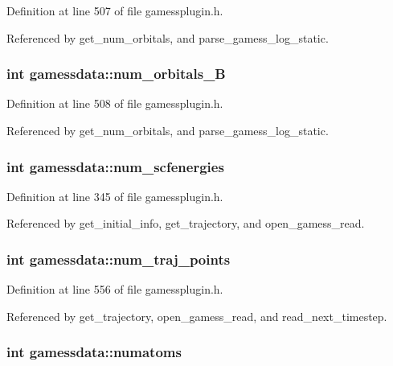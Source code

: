 Definition at line 507 of file gamessplugin.h.

Referenced by get\_\-num\_\-orbitals, and parse\_\-gamess\_\-log\_\-static.
\subsubsection{\setlength{\rightskip}{0pt plus 5cm}int gamessdata::num\_\-orbitals\_\-B}\label{structgamessdata_m70}




Definition at line 508 of file gamessplugin.h.

Referenced by get\_\-num\_\-orbitals, and parse\_\-gamess\_\-log\_\-static.
\subsubsection{\setlength{\rightskip}{0pt plus 5cm}int gamessdata::num\_\-scfenergies}\label{structgamessdata_m26}




Definition at line 345 of file gamessplugin.h.

Referenced by get\_\-initial\_\-info, get\_\-trajectory, and open\_\-gamess\_\-read.
\subsubsection{\setlength{\rightskip}{0pt plus 5cm}int gamessdata::num\_\-traj\_\-points}\label{structgamessdata_m78}




Definition at line 556 of file gamessplugin.h.

Referenced by get\_\-trajectory, open\_\-gamess\_\-read, and read\_\-next\_\-timestep.
\subsubsection{\setlength{\rightskip}{0pt plus 5cm}int gamessdata::numatoms}\label{structgamessdata_m1}





